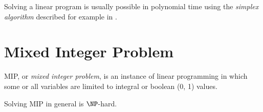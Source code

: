 Solving a linear program is usually possible in polynomial time using the \textit{simplex algorithm} described for example in \cite{dantzig1998linear}.

\section{Mixed Integer Problem}


\begin{define}
	MIP, or \textit{mixed integer problem}, is an instance of linear programming in which some or all variables are limited to integral or boolean (0, 1) values.
\end{define}

Solving MIP in general is $\NP$-hard.